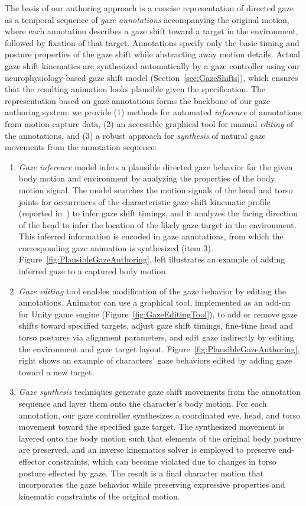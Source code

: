 The basis of our authoring approach is a concise representation of directed gaze as a temporal sequence of \emph{gaze annotations} accompanying the original motion, where each annotation describes a gaze shift toward a target in the environment, followed by fixation of that target. Annotations specify only the basic timing and posture properties of the gaze shift while abstracting away motion details. Actual gaze shift kinematics are synthesized automatically by a gaze controller using our neurophysiology-based gaze shift model (Section~\ref{sec:GazeShifts}), which ensures that the resulting animation looks plausible given the specification. The representation based on gaze annotations forms the backbone of our gaze authoring system: we provide (1) methods for automated \emph{inference} of annotations from motion capture data, (2) an accessible graphical tool for manual \emph{editing} of the annotations, and (3) a robust approach for \emph{synthesis} of natural gaze movements from the annotation sequence:

\begin{enumerate}
\item \emph{Gaze inference} model infers a plausible directed gaze behavior for the given body motion and environment by analyzing the properties of the body motion signal. The model searches the motion signals of the head and torso joints for occurrences of the characteristic gaze shift kinematic profile (reported in~\citep{pejsa2015gaze}) to infer gaze shift timings, and it analyzes the facing direction of the head to infer the location of the likely gaze target in the environment. This inferred information is encoded in gaze annotations, from which the corresponding gaze animation is synthesized (item 3). Figure~\ref{fig:PlausibleGazeAuthoring}, left illustrates an example of adding inferred gaze to a captured body motion.
\item \emph{Gaze editing} tool enables modification of the gaze behavior by editing the annotations. Animator can use a graphical tool, implemented as an add-on for Unity game engine (Figure~\ref{fig:GazeEditingTool}), to add or remove gaze shifts toward specified targets, adjust gaze shift timings, fine-tune head and torso postures via alignment parameters, and edit gaze indirectly by editing the environment and gaze target layout. Figure~\ref{fig:PlausibleGazeAuthoring}, right shows an example of characters' gaze behaviors edited by adding gaze toward a new target.
\item \emph{Gaze synthesis} techniques generate gaze shift movements from the annotation sequence and layer them onto the character’s body motion. For each annotation, our gaze controller synthesizes a coordinated eye, head, and torso movement toward the specified gaze target. The synthesized movement is layered onto the body motion such that elements of the original body posture are preserved, and an inverse kinematics solver is employed to preserve end-effector constraints, which can become violated due to changes in torso posture effected by gaze. The result is a final character motion that incorporates the gaze behavior while preserving expressive properties and kinematic constraints of the original motion.
\end{enumerate}

